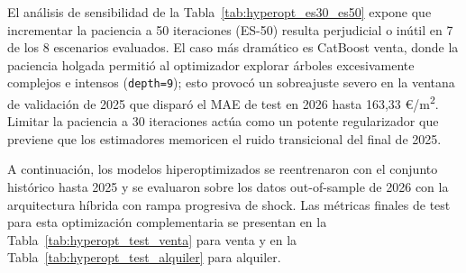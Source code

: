 \documentclass[a4paper,11pt,openany]{book}
\begin{document}
\begin{table}[H]
\centering
{}
\caption[Comparativa de paciencia de Early Stopping ES-30 vs ES-50]{Comparativa de rendimiento out-of-sample en 2026 variando la paciencia del Early Stopping entre 30 y 50 iteraciones para los modelos hiperoptimizados.}
\label{tab:hyperopt_es30_es50}
\end{table}

El análisis de sensibilidad de la Tabla~\ref{tab:hyperopt_es30_es50} expone que incrementar la paciencia a 50 iteraciones (ES-50) resulta perjudicial o inútil en 7 de los 8 escenarios evaluados. El caso más dramático es CatBoost venta, donde la paciencia holgada permitió al optimizador explorar árboles excesivamente complejos e intensos (\texttt{depth=9}); esto provocó un sobreajuste severo en la ventana de validación de 2025 que disparó el MAE de test en 2026 hasta 163,33 €/m\textsuperscript{2}. Limitar la paciencia a 30 iteraciones actúa como un potente regularizador que previene que los estimadores memoricen el ruido transicional del final de 2025.

A continuación, los modelos hiperoptimizados se reentrenaron con el conjunto histórico hasta 2025 y se evaluaron sobre los datos out-of-sample de 2026 con la arquitectura híbrida con rampa progresiva de shock. Las métricas finales de test para esta optimización complementaria se presentan en la Tabla~\ref{tab:hyperopt_test_venta} para venta y en la Tabla~\ref{tab:hyperopt_test_alquiler} para alquiler.
\end{document}
